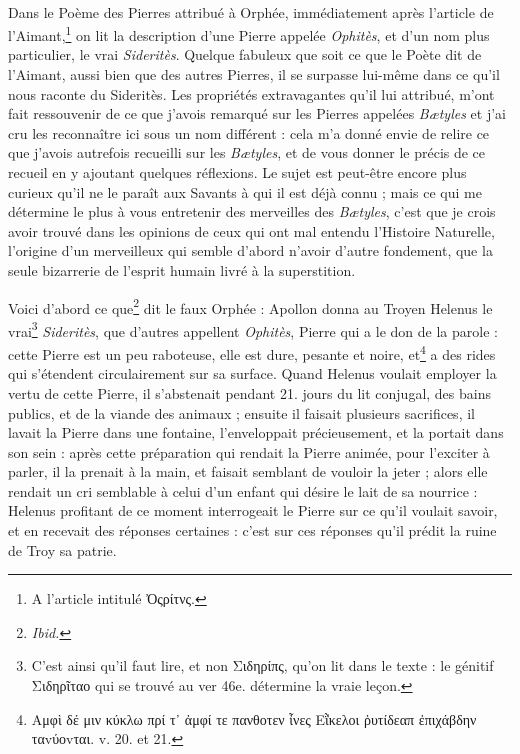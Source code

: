 \documentclass[a4paper, 11pt, oneside, polutonikogreek, french]{article}
\begin{document}
\paragraph{}
Dans le Poème des Pierres attribué à Orphée, immédiatement après l'article de l'Aimant,\footnote{A l'article intitulé Ὀςρίτνς.} on lit la description d'une Pierre appelée \emph{Ophitès}, et d'un nom plus particulier, le vrai \emph{Sideritès}. Quelque fabuleux que soit ce que le Poète dit de l'Aimant, aussi bien que des autres Pierres, il se surpasse lui-même dans ce qu'il nous raconte du Sideritès. Les propriétés extravagantes qu'il lui attribué, m'ont fait ressouvenir de ce que j'avois remarqué sur les Pierres appelées \emph{Bætyles} et j'ai cru les reconnaître ici sous un nom différent : cela m'a donné envie de relire ce que j'avois autrefois recueilli sur les \emph{Bætyles}, et de vous donner le précis de ce recueil en y ajoutant quelques réflexions. Le sujet est peut-être encore plus curieux qu'il ne le paraît aux Savants à qui il est déjà connu ; mais ce qui me détermine le plus à vous entretenir des merveilles des \emph{Bætyles}, c'est que je crois avoir trouvé dans les opinions de ceux qui ont mal entendu l'Histoire Naturelle, l'origine d'un merveilleux qui semble d'abord n'avoir d'autre fondement, que la seule bizarrerie de l'esprit humain livré à la superstition.

Voici d'abord ce que\footnote{\emph{Ibid.}} dit le faux Orphée : Apollon donna au Troyen Helenus le vrai\footnote{C'est ainsi qu'il faut lire, et non Σιδηρίπς, qu'on lit dans le texte : le génitif Σιδηρῖταο qui se trouvé au ver 46e. détermine la vraie leçon.} \emph{Sideritès}, que d'autres appellent \emph{Ophitès}, Pierre qui a le don de la parole : cette Pierre est un peu raboteuse, elle est dure, pesante et noire, et\footnote{Αμφὶ δέ μιν κύκλω πρί τ᾽ ἀμφί τε πανθοτεν ἶνες Εῗκελοι ῥυτίδεαπ ἐπιχάβδην ταvύοvται. v. 20. et 21.} a des rides qui s'étendent circulairement sur sa surface. Quand Helenus voulait employer la vertu de cette Pierre, il s'abstenait pendant 21. jours du lit conjugal, des bains publics, et de la viande des animaux ; ensuite il faisait plusieurs sacrifices, il lavait la Pierre dans une fontaine, l'enveloppait précieusement, et la portait dans son sein : après cette préparation qui rendait la Pierre animée, pour l'exciter à parler, il la prenait à la main, et faisait semblant de vouloir la jeter ; alors elle rendait un cri semblable à celui d'un enfant qui désire le lait de sa nourrice : Helenus profitant de ce moment interrogeait le Pierre sur ce qu'il voulait savoir, et en recevait des réponses certaines : c'est sur ces réponses qu'il prédit la ruine de Troy sa patrie.
\end{document}
